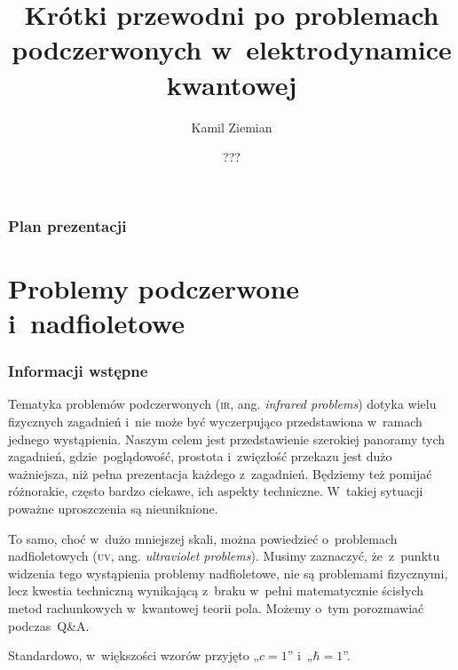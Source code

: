 \documentclass[10pt,t]{beamer}
\title{Krótki przewodni po problemach podczerwonych
  w~elektrodynamice kwantowej}
\author{Kamil Ziemian \\
  \email}
\date[???]{???}
\begin{document}





\RaggedRight





\maketitle





\begin{frame}
  \frametitle{Plan prezentacji}


  \tableofcontents

\end{frame}










\section{Problemy podczerwone i~nadfioletowe}



\begin{frame}
  \frametitle{Informacji wstępne}


  Tematyka problemów podczerwonych (\textsc{ir}, ang. \textit{infrared
    problems}) dotyka wielu fizycznych zagadnień i~nie może być
  wyczerpująco przedstawiona w~ramach jednego wystąpienia. Naszym
  celem jest przedstawienie szerokiej panoramy tych zagadnień,
  gdzie~poglądowość, prostota i~zwięzłość przekazu jest dużo ważniejsza,
  niż pełna prezentacja każdego
  z~zagadnień. Będziemy też pomijać różnorakie, często bardzo ciekawe, ich
  aspekty techniczne. W~takiej sytuacji poważne uproszczenia są
  nieuniknione.

  To samo, choć w~dużo mniejszej skali, można powiedzieć o~problemach
  nadfioletowych (\textsc{uv}, ang. \textit{ultraviolet problems}).
  Musimy zaznaczyć, że~z~punktu widzenia tego wystąpienia problemy
  nadfioletowe, \alert{nie} są problemami fizycznymi, lecz kwestia
  techniczną wynikającą z~braku w~pełni matematycznie ścisłych metod
  rachunkowych w~kwantowej teorii pola. Możemy o~tym porozmawiać
  podczas~Q\&A.

  Standardowo, w~większości wzorów przyjęto „$c = 1$”
  i~„\HorSpaceFour$\hbar = 1$”.

\end{frame}
\end{document}
